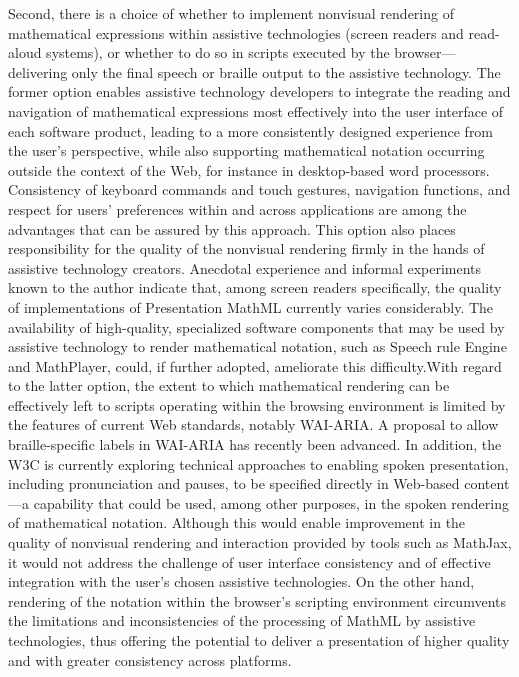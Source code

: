 \documentclass[11.5pt]{sig-alternate} %
\begin{document}
\begin{large}
Second, there is a choice of whether to implement nonvisual rendering of mathematical expressions within assistive technologies (screen readers and read-aloud systems), or whether to do so in scripts executed by the browser—deliver\-ing only the final speech or braille output to the assistive technology. The former option enables assistive technology developers to integrate the reading and navigation of mathematical expressions most effectively into the user interface of each software product, leading to a more consistently designed experience from the user’s perspective, while also supporting mathematical notation occurring outside the context of the Web, for instance in desktop-based word processors. Consistency of keyboard commands and touch gestures, navigation functions, and respect for users’ preferences within and across applications are among the advantages that can be assured by this approach. This option also places responsibility for the quality of the nonvisual rendering firmly in the hands of assistive technology creators. Anecdotal experience and informal experiments known to the author indicate that, among screen readers specifically, the quality of implementations of Presentation MathML currently varies considerably. The availability of high-quality, specialized software components that may be used by assistive technology to render mathematical notation, such as Speech rule Engine and MathPlayer, could, if further adopted, ameliorate this difficulty.With regard to the latter option, the extent to which mathematical rendering can be effectively left to scripts operating within the browsing environment is limited by the features of current Web standards, notably WAI-ARIA. A proposal to allow braille-specific labels in WAI-ARIA has recently been advanced. In addition, the W3C is currently exploring technical approaches to enabling spoken presentation, including pronunciation and pauses, to be specified directly in Web-based content—a capability that could be used, among other purposes, in the spoken rendering of mathematical notation. Although this would enable improvement in the quality of nonvisual rendering and interaction provided by tools such as MathJax, it would not address the challenge of user interface consistency and of effective integration with the user’s chosen assistive technologies. On the other hand, rendering of the notation within the browser’s scripting environment circumvents the limitations and inconsistencies of the processing of MathML by assistive technologies, thus offering the potential to deliver a presentation of higher quality and with greater consistency across platforms.


\end{large}
\end{document}
